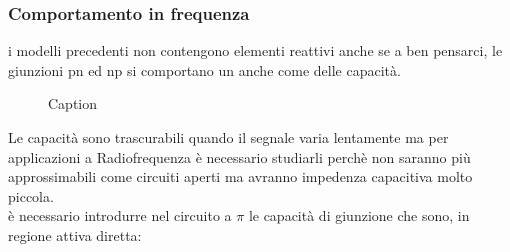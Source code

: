 \subsubsection{Comportamento in frequenza}
i modelli precedenti non contengono elementi reattivi anche se a ben pensarci, le giunzioni pn ed np si comportano un anche come delle capacità.
%
\begin{figure}[hbt!]
    \centering
    \caption{Caption}
    \label{fig:enter-label}
\end{figure}
%
Le capacità sono trascurabili quando il segnale varia lentamente ma per applicazioni a Radiofrequenza è necessario studiarli perchè  non saranno più approssimabili come circuiti aperti ma avranno impedenza capacitiva molto piccola.\\
è necessario introdurre nel circuito a $\pi$ le capacità di giunzione che sono, in regione attiva diretta:
%
